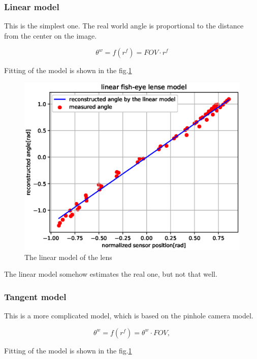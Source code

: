 \documentclass[a4paper,12pt,titlepage, twoside]{article}
\numberwithin{figure}{section}
\begin{document}
\subsubsection{Linear model}

This is the simplest one. The real world angle is proportional to the distance from the center on the image. 

\begin{equation}
\theta^w = f(r^f) = FOV \cdot r^f
\end{equation}

Fitting of the model is shown in the fig.\ref{fig:linear_model}

\begin{figure}[h!]
\centering
\includegraphics[width=1\linewidth]{fig/linear_model3.eps}
\caption{The linear model of the lens}
\label{fig:linear_model}
\end{figure}

The linear model somehow estimates the real one, but not that well.

\subsubsection{Tangent model}

This is a more complicated model, which is based on the pinhole camera model.

\begin{equation}
\theta^w = f(r^f) = \theta^w \cdot FOV,
\end{equation}

Fitting of the model is shown in the fig.\ref{fig:linear_model}
\end{document}
